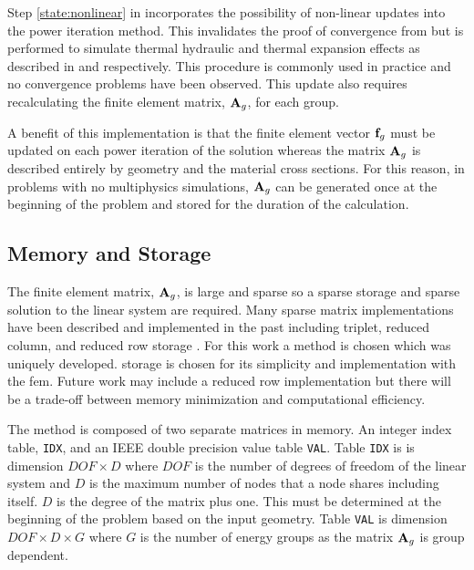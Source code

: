     Step \ref{state:nonlinear} in  incorporates
    the possibility of non-linear updates into the power iteration method. This
    invalidates the proof of convergence from  but is
    performed to simulate thermal hydraulic and thermal expansion effects as
    described in  and 
    respectively. This procedure is commonly used in practice and no convergence 
    problems have been observed. This update also requires recalculating the 
    finite element matrix, $\mathbf{A}_g$, for each group.
    
    A benefit of this implementation is that the finite element vector $\mathbf{f}_g$
    must be updated on each power iteration of the solution whereas the matrix
    $\mathbf{A}_g$ is described entirely by geometry and the material cross sections.
    For this reason, in problems with no multiphysics simulations, $\mathbf{A}_g$ can
    be generated once at the beginning of the problem and stored for the
    duration of the calculation.

    \FloatBarrier %

  \subsection{Memory and Storage}
    The finite element matrix, $\mathbf{A}_g$, is large and sparse so a sparse storage 
    and sparse solution to the linear system are required. Many sparse matrix 
    implementations have been described and implemented in the past including
    triplet, reduced column, and reduced row storage \cite{sparseBLAS}.  For 
    this work a \twotable method is chosen which was uniquely developed. 
    \twotable storage is chosen for its simplicity and implementation with the 
    \gls{fem}. Future work may include a reduced row implementation but there 
    will be a trade-off between memory minimization and computational 
    efficiency.
    
    The \twotable method is composed of two separate matrices in memory. An
    integer index table, \texttt{IDX}, and an IEEE double precision value table
    \texttt{VAL}. Table \texttt{IDX} is is dimension $DOF \times D$ where $DOF$
    is the number of degrees of freedom of the linear system and $D$ is the
    maximum number of nodes that a node shares including itself. $D$ is the
    degree of the matrix plus one. This must be determined at the beginning of
    the problem based on the input geometry.  Table \texttt{VAL} is dimension
    $DOF \times D \times G$ where $G$ is the number of energy groups as the
    matrix $\mathbf{A}_g$ is group dependent.
    

